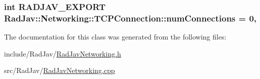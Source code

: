 \subsubsection[{\texorpdfstring{num\+Connections}{numConnections}}]{\setlength{\rightskip}{0pt plus 5cm}int R\+A\+D\+J\+A\+V\+\_\+\+E\+X\+P\+O\+RT Rad\+Jav\+::\+Networking\+::\+T\+C\+P\+Connection\+::num\+Connections = 0\hspace{0.3cm}{\ttfamily [static]}, {\ttfamily [protected]}}\hypertarget{class_rad_jav_1_1_networking_1_1_t_c_p_connection_ad1ed3c88e6ee99be735b8c846ab70749}{}\label{class_rad_jav_1_1_networking_1_1_t_c_p_connection_ad1ed3c88e6ee99be735b8c846ab70749}


The documentation for this class was generated from the following files\+:\begin{DoxyCompactItemize}
\item 
include/\+Rad\+Jav/\hyperlink{_rad_jav_networking_8h}{Rad\+Jav\+Networking.\+h}\item 
src/\+Rad\+Jav/\hyperlink{_rad_jav_networking_8cpp}{Rad\+Jav\+Networking.\+cpp}\end{DoxyCompactItemize}
